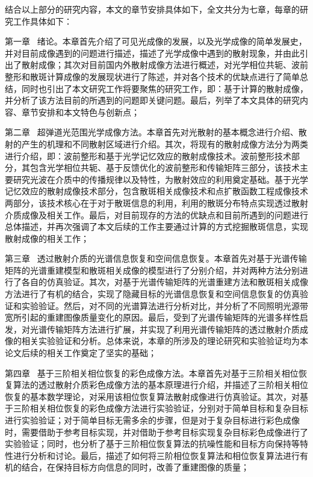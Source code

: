 结合以上部分的研究内容，本文的章节安排具体如下，全文共分为七章，每章的研究工作具体如下：

第一章 \ 绪论。本章首先介绍了可见光成像的发展，以及光学成像的简单发展史，并对目前成像遇到的问题进行描述，描述了光学成像中遇到的散射现象，并由此引出了散射成像；其次对目前国内外散射成像方法进行概述，对光学相位共轭、波前整形和散斑计算成像的发展现状进行了陈述，并对各个技术的优缺点进行了简单总结，同时也引出了本文研究工作将要聚焦的研究工作，即：基于计算的散射成像，并分析了该方法目前的所遇到的问题即关键问题。最后，列举了本文具体的研究内容、章节安排和本文特色与创新点；

第二章 \ 超弹道光范围光学成像方法。本章首先对光散射的基本概念进行介绍、散射的产生的机理和不同散射区域进行介绍。其次，将现有的散射成像方法分为两类进行介绍，即：波前整形和基于光学记忆效应的散射成像技术。波前整形技术部分，其包含光学相位共轭、基于反馈优化的波前整形和传输矩阵三部分，该技术主要研究光波在介质中的传播规律以及特性，为散射效应的利用奠定基础。基于光学记忆效应的散射成像技术部分，包含散斑相关成像技术和点扩散函数工程成像技术两部分，该技术核心在于对于散斑信息的利用，利用的散斑分布特点实现透过散射介质成像及相关工作。最后，对目前现存的方法的优缺点和目前所遇到的问题进行总体描述，并再次强调了本文后续的工作主要通过计算的方式挖掘散斑信息，实现散射成像的相关工作；

第三章 \ 透过散射介质的光谱信息恢复和空间信息恢复。本章首先对基于光谱传输矩阵的光谱重建模型和散斑相关成像的模型进行了分别介绍，并对两种方法分别进行了各自的仿真验证。其次，对基于光谱传输矩阵的光谱重建方法和散斑相关成像方法进行了有机的结合，实现了隐藏目标的光谱信息恢复和空间信息恢复的仿真验证和实验验证。然后，对不同的光谱算法进行分析对比，并分析了不同照明光源带宽所引起的重建图像质量变化的原因。最后，受到了光谱传输矩阵的光谱多样性启发，对光谱传输矩阵方法进行扩展，并实现了利用光谱传输矩阵的透过散射介质成像的相关实验验证和分析。总体来说，本章的所涉及的理论研究和实验验证均为本论文后续的相关工作奠定了坚实的基础；

第四章 \ 基于三阶相关相位恢复的彩色成像方法。本章首先对基于三阶相关相位恢复算法的透过散射介质彩色成像方法的基本原理进行介绍，并描述了三阶相关相位恢复的基本数学理论，对采用该相位恢复算法散射成像进行仿真验证。其次，对基于三阶相关相位恢复的彩色成像方法进行实验验证，分别对于简单目标和复杂目标进行实验验证；对于简单目标无需多余的步骤，但是对于复杂目标进行彩色成像时，需要借助于参考目标实现，并对借助于参考目标实现复杂目标彩色成像进行了实验验证；同时，也分析了基于三阶相位恢复算法的抗噪性能和目标方向保持等特性进行分析和讨论。最后，描述了如何将三阶相位恢复算法和相位恢复算法进行有机的结合，在保持目标方向信息的同时，改善了重建图像的质量；



